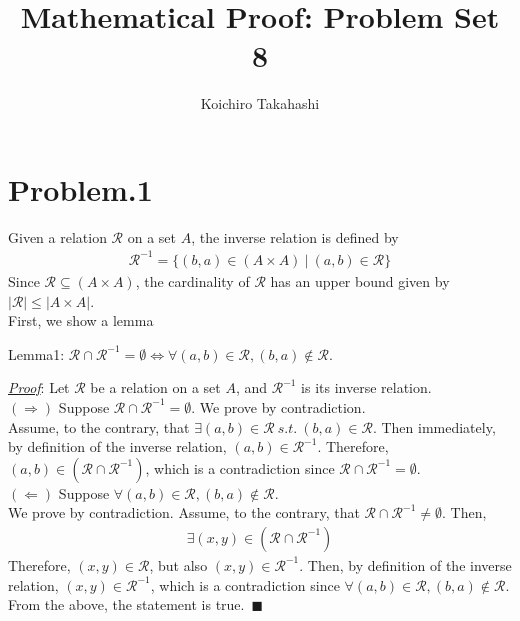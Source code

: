 \documentclass[12pt]{article}
\begin{document}
\title{Mathematical Proof: Problem Set 8}
\author{Koichiro Takahashi}
\maketitle

\section*{Problem.1}
Given a relation $\mathcal{R}$ on a set $A$, the inverse relation is defined by
\begin{gather*}
\mathcal{R}^{-1} = \{ (b,a) \in (A \times A) ~|~ (a,b) \in \mathcal{R} \}
\end{gather*}
Since $\mathcal{R} \subseteq (A \times A)$, the cardinality of $\mathcal{R}$ has an upper bound given by $|\mathcal{R}| \leq |A \times A|$. \\
First, we show a lemma
\begin{center}
Lemma1: $\mathcal{R} \cap \mathcal{R}^{-1} = \emptyset \Leftrightarrow \forall (a,b) \in \mathcal{R}, (b,a) \notin \mathcal{R}$.
\end{center}
\underline{\textit{Proof}}: Let $\mathcal{R}$ be a relation on a set $A$, and $\mathcal{R}^{-1}$ is its inverse relation.\\[1em]
$\left( \Rightarrow \right)$ Suppose $\mathcal{R} \cap \mathcal{R}^{-1} = \emptyset$. We prove by contradiction.\\[1em]
Assume, to the contrary, that $\exists (a,b) \in \mathcal{R} ~s.t.~ (b,a) \in \mathcal{R}$. Then immediately, by definition of the inverse relation, $(a, b) \in \mathcal{R}^{-1}$. Therefore, $(a, b) \in \left( \mathcal{R} \cap \mathcal{R}^{-1} \right)$, which is a contradiction since $\mathcal{R} \cap \mathcal{R}^{-1} = \emptyset$. \\[1em]
$\left( \Leftarrow \right)$ Suppose $\forall (a,b) \in \mathcal{R}, (b,a) \notin \mathcal{R}$.\\
We prove by contradiction. Assume, to the contrary, that $\mathcal{R} \cap \mathcal{R}^{-1} \neq \emptyset$. Then,
\begin{gather*}
\exists (x,y) \in (\mathcal{R} \cap \mathcal{R}^{-1})
\end{gather*}
Therefore, $(x,y) \in \mathcal{R}$, but also $(x, y) \in \mathcal{R}^{-1}$. Then, by definition of the inverse relation, $(x, y) \in \mathcal{R}^{-1}$, which is a contradiction since $\forall (a,b) \in \mathcal{R}, (b,a) \notin \mathcal{R}$.\\[1em]
From the above, the statement is true.~$\blacksquare$\\[1em]
\end{document}
